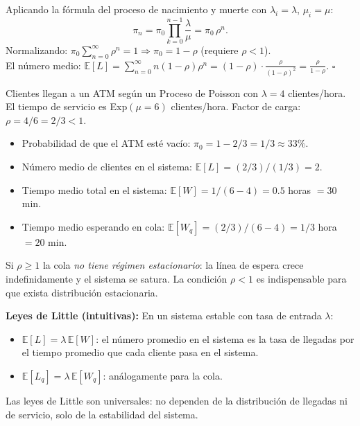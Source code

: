 \documentclass[10pt,a4paper]{article}
\numberwithin{equation}{section}
\newcommand{\E}[1]{\mathbb{E}\!\left[#1\right]}
\newcounter{excount}[section]
\renewcommand{\theexcount}{\thesection.\arabic{excount}}
\newenvironment{ejemplo}[1]{%
  \refstepcounter{excount}%
  \begin{tcolorbox}[exbox, title={Ejemplo \theexcount\ \textperiodcentered\ #1}]%
}{\end{tcolorbox}}
\newenvironment{nota}{\begin{tcolorbox}[notebox]}{\end{tcolorbox}}
\newenvironment{cuidado}{\begin{tcolorbox}[warnbox]}{\end{tcolorbox}}
\newenvironment{demostracion}{\begin{tcolorbox}[proofbox]}{\hfill$\square$\end{tcolorbox}}
\begin{document}
\begin{demostracion}
  Aplicando la f\'ormula del proceso de nacimiento y muerte con $\lambda_i=\lambda$,
  $\mu_i=\mu$:
  \[
    \pi_n = \pi_0 \prod_{k=0}^{n-1}\frac{\lambda}{\mu} = \pi_0\,\rho^n.
  \]
  Normalizando: $\pi_0\sum_{n=0}^\infty \rho^n = 1 \Rightarrow \pi_0 = 1-\rho$ (requiere $\rho < 1$).\\
  El n\'umero medio: $\E{L} = \sum_{n=0}^\infty n(1-\rho)\rho^n = (1-\rho)\cdot\frac{\rho}{(1-\rho)^2}
  = \frac{\rho}{1-\rho}$.
\end{demostracion}

\begin{ejemplo}{Cola de un cajero autom\'atico}
  Clientes llegan a un ATM seg\'un un Proceso de Poisson con $\lambda = 4$ clientes/hora.
  El tiempo de servicio es Exp$(\mu=6)$ clientes/hora. Factor de carga: $\rho = 4/6 = 2/3 < 1$.
  \begin{itemize}
    \item Probabilidad de que el ATM est\'e vac\'io: $\pi_0 = 1 - 2/3 = 1/3 \approx 33\%$.
    \item N\'umero medio de clientes en el sistema: $\E{L} = (2/3)/(1/3) = 2$.
    \item Tiempo medio total en el sistema: $\E{W} = 1/(6-4) = 0.5$ horas $= 30$ min.
    \item Tiempo medio esperando en cola: $\E{W_q} = (2/3)/(6-4) = 1/3$ hora $= 20$ min.
  \end{itemize}
\end{ejemplo}

\begin{cuidado}
  Si $\rho \ge 1$ la cola \emph{no tiene r\'egimen estacionario}: la l\'inea de espera crece
  indefinidamente y el sistema se satura. La condici\'on $\rho < 1$ es indispensable para
  que exista distribuci\'on estacionaria.
\end{cuidado}

\begin{nota}
  \textbf{Leyes de Little (intuitivas):} En un sistema estable con tasa de entrada $\lambda$:
  \begin{itemize}
    \item $\E{L} = \lambda\,\E{W}$: el n\'umero promedio en el sistema es la tasa de llegadas
          por el tiempo promedio que cada cliente pasa en el sistema.
    \item $\E{L_q} = \lambda\,\E{W_q}$: an\'alogamente para la cola.
  \end{itemize}
  Las leyes de Little son universales: no dependen de la distribuci\'on de llegadas ni
  de servicio, solo de la estabilidad del sistema.
\end{nota}
\end{document}
